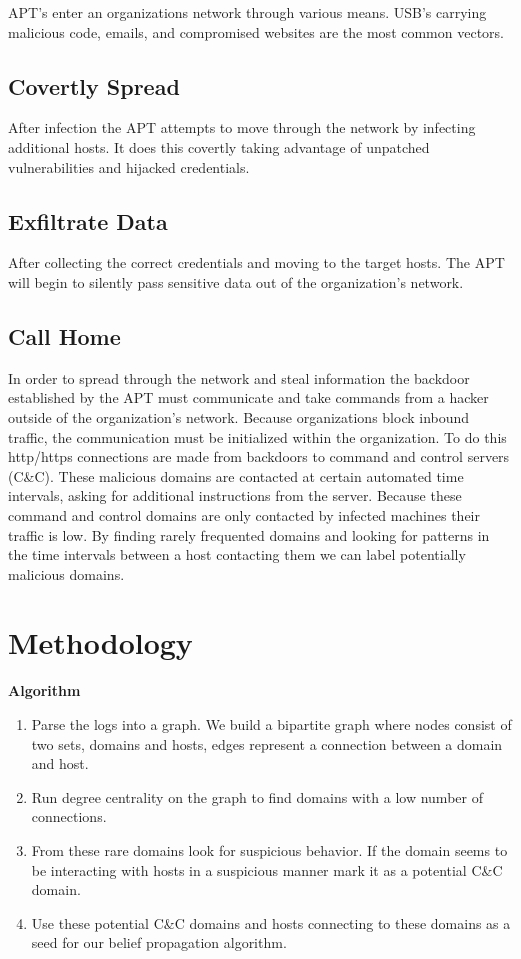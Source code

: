 \documentclass{article} %
\begin{document}
APT's enter an organizations network through various means. USB's carrying malicious code, emails, and compromised websites are the most common vectors. 

\subsection{Covertly Spread}
After infection the APT attempts to move through the network by infecting additional hosts. It does this covertly taking advantage of unpatched vulnerabilities and hijacked credentials.

\subsection{Exfiltrate Data}
After collecting the correct credentials and moving to the target hosts. The APT will begin to silently pass sensitive data out of the organization's network. 

\subsection{Call Home}
In order to spread through the network and steal information the backdoor established by the APT must communicate and take commands from a hacker outside of the organization's network. Because organizations block inbound traffic, the communication must be initialized within the organization. To do this http/https connections are made from backdoors to command and control servers (C\&C). These malicious domains are contacted at certain automated time intervals, asking for additional instructions from the server. Because these command and control domains are only contacted by infected machines their traffic is low. By finding rarely frequented domains and looking for patterns in the time intervals between a host contacting them we can label potentially malicious domains. 



\section{Methodology}
\label{method}

	\textbf{Algorithm}
	
	\begin{enumerate}
		
        \item Parse the logs into a graph. We build a bipartite graph where nodes consist of two sets, domains and hosts, edges represent a connection between a domain and host.
        \item Run degree centrality on the graph to find domains with a low number of connections.
        \item From these rare domains look for suspicious behavior. If the domain seems to be interacting with hosts in a suspicious manner mark it as a potential C\&C domain. 
        \item Use these potential C\&C domains and hosts connecting to these domains as a seed for our belief propagation algorithm.
    \end{enumerate}
\end{document}
